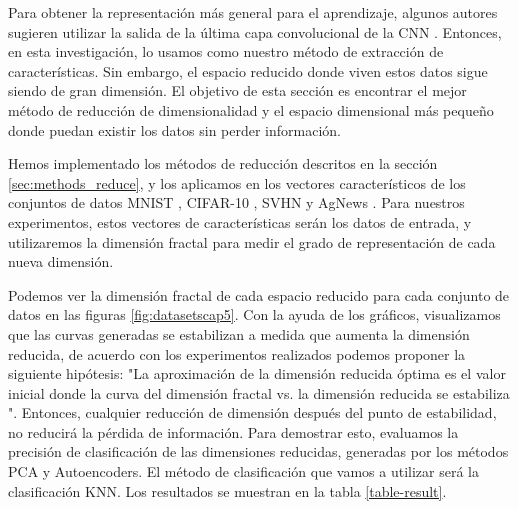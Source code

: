 Para obtener la representación más general para el aprendizaje, algunos autores sugieren utilizar la salida de la última capa convolucional de la CNN \cite{DBLP:journals/corr/SablayrollesDJU16}. Entonces, en esta investigación, lo usamos como nuestro método de extracción de características. Sin embargo, el espacio reducido donde viven estos datos sigue siendo de gran dimensión. El objetivo de esta sección es encontrar el mejor método de reducción de dimensionalidad y el espacio dimensional más pequeño donde puedan existir los datos sin perder información.

Hemos implementado los métodos de reducción descritos en la sección \ref{sec:methods_reduce}, y los aplicamos en los vectores característicos de los conjuntos de datos MNIST \cite{lecun-mnisthandwrittendigit-2010}, CIFAR-10 \cite{cifar10}, SVHN \cite{svhn} y AgNews \cite{DelCorso:2005:RSN:1060745.1060764}. Para nuestros experimentos, estos vectores de características serán los datos de entrada, y utilizaremos la dimensión fractal para medir el grado de representación de cada nueva dimensión.



Podemos ver la dimensión fractal de cada espacio reducido para cada conjunto de datos en las figuras \ref{fig:datasetscap5}. Con la ayuda de los gráficos, visualizamos que las curvas generadas se estabilizan a medida que aumenta la dimensión reducida, de acuerdo con los experimentos realizados podemos proponer la siguiente hipótesis: "La aproximación de la dimensión reducida óptima es el valor inicial donde la curva del dimensión fractal vs. la dimensión reducida se estabiliza ". Entonces, cualquier reducción de dimensión después del punto de estabilidad, no reducirá la pérdida de información. Para demostrar esto, evaluamos la precisión de clasificación de las dimensiones reducidas, generadas por los métodos PCA y Autoencoders. El método de clasificación que vamos a utilizar será la clasificación KNN. Los resultados se muestran en la tabla \ref{table-result}.


